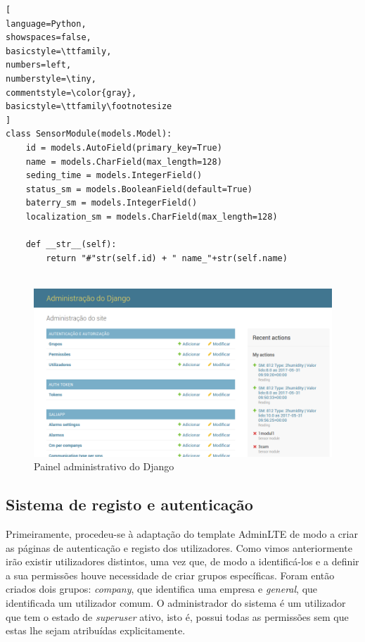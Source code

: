 \begin{lstlisting}[
language=Python,
showspaces=false,
basicstyle=\ttfamily,
numbers=left,
numberstyle=\tiny,
commentstyle=\color{gray},
basicstyle=\ttfamily\footnotesize
]
class SensorModule(models.Model):
	id = models.AutoField(primary_key=True)
	name = models.CharField(max_length=128)
	seding_time = models.IntegerField()
	status_sm = models.BooleanField(default=True)
	baterry_sm = models.IntegerField()
	localization_sm = models.CharField(max_length=128)
		
	def __str__(self):
		return "#"str(self.id) + " name_"+str(self.name)


\end{lstlisting}


\begin{figure}[!htb]
	\centering
	\includegraphics[scale=0.4]{prints-web/admindjango.png}
	\caption{Painel administrativo do Django }
	\label{admingdjango}
\end{figure}








\subsection{Sistema de registo e autenticação}

Primeiramente, procedeu-se à adaptação do template AdminLTE de modo a criar as páginas de autenticação e registo dos utilizadores. Como vimos anteriormente irão existir utilizadores distintos, uma vez que, de modo a identificá-los e a definir a sua permissões houve necessidade de criar grupos específicas. Foram então criados dois grupos:  \textit{company}, que identifica uma empresa e \textit{general}, que identificada um utilizador comum. O administrador do sistema é um utilizador que tem o estado de \textit{superuser} ativo, isto é, possui todas as permissões sem que estas lhe sejam atribuídas explicitamente.


